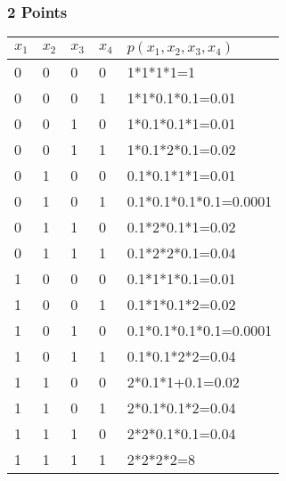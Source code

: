 \subsubsection{2 Points}
  \begin{tabular}{ | l | l | l | l | l |}
	    \hline
$x_1$ &  $ x_2$  &  $x_3$ &  $x_4$  & $ p(x_1,x_2,x_3,x_4)$  \\ \hline
0	&   0	 &	0  &  	0   &    1*1*1*1=1                       \\ \hline
0	&   0	 &	0  & 	1   &    1*1*0.1*0.1=0.01	          \\ \hline
0	&   0	 &	1  &	0   &    1*0.1*0.1*1=0.01	          \\ \hline
0	&   0	 &	1  &	1   &    1*0.1*2*0.1=0.02           \\ \hline
0	&   1	 &	0  &	0   &    0.1*0.1*1*1=0.01           \\ \hline
0	&   1	 &	0  &	1   &    0.1*0.1*0.1*0.1=0.0001\\ \hline
0	&   1	 &	1  &	0   &    0.1*2*0.1*1=0.02           \\ \hline
0	&   1	 &	1  &	1   &    0.1*2*2*0.1=0.04           \\ \hline
1	&   0	 &	0  &	0   &    0.1*1*1*0.1=0.01           \\ \hline
1	&   0	 &	0  &	1   &    0.1*1*0.1*2=0.02           \\ \hline
1	&   0	 &	1  &	0   &    0.1*0.1*0.1*0.1=0.0001\\ \hline
1	&   0	 &	1  &	1   &    0.1*0.1*2*2=0.04           \\ \hline
1	&   1	 &	0  &	0   &    2*0.1*1+0.1=0.02           \\ \hline
1	&   1	 &	0  &	1   &    2*0.1*0.1*2=0.04            \\ \hline
1	&   1	 &	1  &	0   &    2*2*0.1*0.1=0.04            \\ \hline
1	&   1	 &	1  &	1   &    2*2*2*2=8                        \\ \hline

  \end{tabular}

